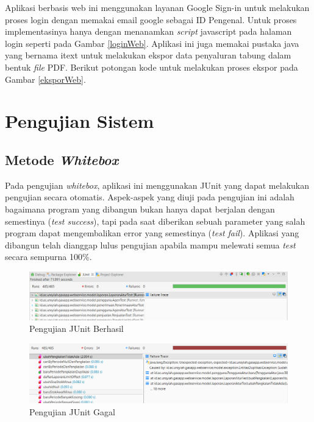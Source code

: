 \begin{enumerate}[a.]
		
	
		Aplikasi berbasis web ini menggunakan layanan Google Sign-in untuk melakukan proses login dengan memakai email google sebagai ID Pengenal. Untuk proses implementasinya hanya dengan menanamkan \textit{script} javascript pada halaman login seperti pada Gambar \ref{loginWeb}. Aplikasi ini juga memakai pustaka java yang bernama itext untuk melakukan ekspor data penyaluran tabung dalam bentuk \textit{file} PDF. Berikut potongan kode untuk melakukan proses ekspor pada Gambar \ref{eksporWeb}.

	\end{enumerate}

	
	\section{Pengujian Sistem}
	
		\subsection{Metode \textit{Whitebox}}
			\par Pada pengujian \textit{whitebox}, aplikasi ini menggunakan JUnit yang dapat melakukan pengujian secara otomatis. Aspek-aspek yang diuji pada pengujian ini adalah bagaimana program yang dibangun bukan hanya dapat berjalan dengan semestinya (\textit{test success}), tapi pada saat diberikan sebuah parameter yang salah program dapat mengembalikan error yang semestinya (\textit{test fail}). Aplikasi yang dibangun telah dianggap lulus pengujian apabila mampu melewati semua \textit{test} secara sempurna 100\%. 
		
			\begin{figure}[H]
				\center
				\includegraphics [width = 14cm]{gambar/kode/junit-success}
				\caption{Pengujian JUnit Berhasil}
				\label{junitSuccess}
			\end{figure}
		
			\begin{figure}[H]
				\center
				\includegraphics [width = 14cm]{gambar/kode/junit-fail}
				\caption{Pengujian JUnit Gagal}
				\label{junitFail}
			\end{figure}
	
